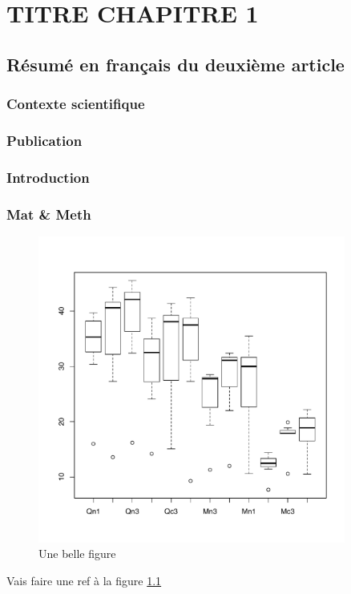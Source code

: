 \chapter{TITRE CHAPITRE 1}
\label{chap1}

\section{Résumé en français du deuxième article}

\subsection{Contexte scientifique}

\subsection{Publication}
\subsection{Introduction}\label{introduction}

\subsection{Mat \& Meth}\label{mat-meth}

\begin{figure}
\centering
\includegraphics[width=0.90000\textwidth]{chapitre1/fig/fig1-chap1.pdf}
\caption{Une belle figure\label{fig:chap1_1}}
\end{figure}

Vais faire une ref à la figure \ref{fig:chap1_1}
